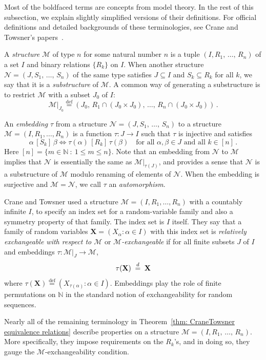 \documentclass[AHL,Unicode,longabstracts,published]{cedram}
\newcommand*{\defeq}{\stackrel{\mathrm{def}}{=}}
\renewcommand{\d}{\buildrel{d}\over{=}}
\newcommand*\N{\mathbb{N}}
\newcommand*\NN{\mathcal{N}}
\newcommand*\MM{\mathcal{M}}
\newcommand*\bX{\mathbf{X}}
\newcommand*\N{\mathbb{N}}
\begin{document}
Most of the boldfaced terms are concepts from model theory. In the rest of this subsection, we explain slightly simplified versions of their definitions. For official definitions and detailed backgrounds of these terminologies, see Crane and Towsner's papers~\cite{crane2017relative,crane2018relatively}.

A \emph{structure} $\MM$ of type $n$ for some natural number $n$ is a tuple $(I,R_1,\,\ldots,\,R_n)$ of a set $I$ and binary relations $\{R_k\}$ on $I$. When another structure $\NN = (J,S_1,\,\ldots,\,S_n)$ of the same type satisfies $J \subseteq I$ and $S_k \subseteq R_k$ for all $k$, we say that it is a \emph{substructure} of $\MM$. A common way of generating a substructure is to restrict $\MM$ with a subset $J_0$ of $I$:
\[
\MM|_{J_0}
\defeq ({J_0},\,R_1\cap ({J_0}\times {J_0}),\,\ldots,\,R_n \cap ({J_0} \times {J_0}))\,.
\]

An \emph{embedding} $\tau$ from a structure $\NN = (J,S_1,\,\ldots,\,S_n)$ to a structure $\MM = (I,R_1,\ldots, R_n)$ is a function $\tau : J \to I$ such that $\tau$ is injective and satisfies
\[
\alpha\, [S_k]\, \beta \iff \tau(\alpha)\,[R_k]\,\tau(\beta)\quad
\text{for all }\alpha,\beta \in J\text{ and all }k \in [n]\,.
\]
Here $[n] = \{m \in \N~:~1 \leq m \leq n\}$. Note that an embedding from $\NN$ to $\MM$ implies that $\NN$ is essentially the same as $\MM|_{\tau(J)}$, and provides a sense that $\NN$ is a substructure of $\MM$ modulo renaming of elements of $\NN$. When the embedding is surjective and $\MM = \NN$, we call $\tau$ an \emph{automorphism}.

Crane and Towsner used a structure $\MM = (I,R_1,\ldots,R_n)$ with a countably infinite $I$, to specify an index set for a random-variable family and also a symmetry property of that family. The index set is $I$ itself. They say that a family of random variables $\bX = (X_\alpha : \alpha\in I)$ with this index set is \emph{relatively exchangeable with respect to $\MM$} or \emph{$\MM$-exchangeable} if for all finite subsets $J$ of $I$ and embeddings $\tau : \MM|_J \to \MM$,
\[
\tau(\bX)\;\d\; \bX
\]
where $\tau(\bX)
\defeq \left(X_{\tau(\alpha)} : \alpha \in I\right)$. Embeddings play the role of finite permutations on $\N$ in the standard notion of exchangeability for random sequences.

Nearly all of the remaining terminology in Theorem~\ref{thm: CraneTowsner equivalence relations} describe properties on a structure $\MM = (I,R_1,\,\ldots,\,R_n)$. More specifically, they impose requirements on the $R_k$'s, and in doing so, they gauge the $\MM$-exchangeability condition.
\end{document}
